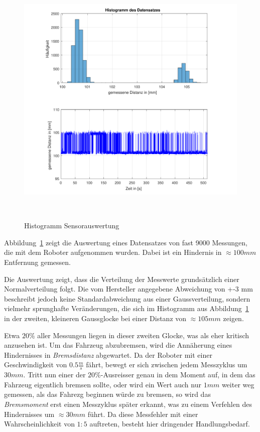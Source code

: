 \documentclass[main.tex]{subfiles} %
\begin{document}
\begin{figure}[H]
    \centering
    \includegraphics[width=0.75\linewidth]{./fig_Parametrierung_HcSr04/Messverteilung_HcSr04.pdf}
    \caption{Histogramm Sensorauswertung}~\label{fig:HistogrammHcSr04}
\end{figure}

Abbildung~\ref{fig:HistogrammHcSr04} zeigt die Auswertung eines Datensatzes von
fast 9000 Messungen, die mit dem Roboter aufgenommen wurden. Dabei ist ein
Hindernis in $\approx 100mm$ Entfernung gemessen.

Die Auswertung zeigt, dass die Verteilung der Messwerte grundsätzlich einer
Normalverteilung folgt. Die vom Hersteller angegebene Abweichung von +-3 mm
beschreibt jedoch keine Standardabweichung aus einer Gaussverteilung, sondern
vielmehr sprunghafte Veränderungen, die sich im Histogramm aus
Abbildung~\ref{fig:HistogrammHcSr04} in der zweiten, kleineren Gaussglocke bei
einer Distanz von $\approx 105mm$ zeigen.

Etwa $20 \%$ aller Messungen liegen in dieser zweiten Glocke, was als eher
kritisch anzusehen ist. Um das Fahrzeug abzubremsen, wird die Annäherung eines
Hindernisses in \textit{Bremsdistanz} abgewartet. Da der Roboter mit einer
Geschwindigkeit von $0.5 \frac{m}{s}$ fährt, bewegt er sich zwischen jedem
Messzyklus um $30 mm$. Tritt nun einer der $20\%$-Ausreisser genau in dem
Moment auf, in dem das Fahrzeug eigentlich bremsen sollte, oder wird ein Wert
auch nur $1mm$ weiter weg gemessen, als das Fahrezg beginnen würde zu bremsen,
so wird das \textit{Bremsmoment} erst einen Messzyklus später erkannt, was zu
einem Verfehlen des Hindernisses um $\approx 30 mm$ führt. Da diese Messfehler
mit einer Wahrscheinlichkeit von $1:5$ auftreten, besteht hier dringender
Handlungsbedarf.
\end{document}
